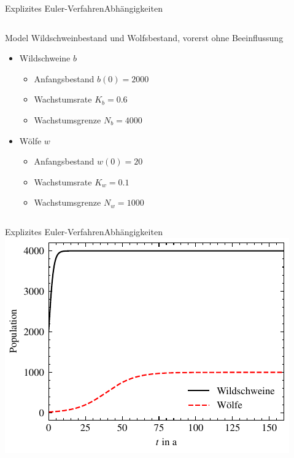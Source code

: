 \documentclass[xelatex,aspectratio=169]{beamer}
\begin{document}
\begin{frame}{Explizites Euler-Verfahren}{Abhängigkeiten}
    \begin{columns}
        \begin{column}{0.5\textwidth}
            \begin{block}{Model}
                Wildschweinbestand und Wolfsbestand, vorerst ohne Beeinflussung
                \begin{itemize}
                    \item Wildschweine $b$
                          \begin{itemize}
                              \item Anfangsbestand $b(0) = 2000$
                              \item Wachstumsrate $K_b = 0.6$
                              \item Wachstumsgrenze $N_b = 4000$
                          \end{itemize}
                    \item Wölfe $w$
                          \begin{itemize}
                              \item Anfangsbestand $w(0) = 20$
                              \item Wachstumsrate $K_w = 0.1$
                              \item Wachstumsgrenze $N_w = 1000$
                          \end{itemize}
                \end{itemize}
            \end{block}
        \end{column}
        \begin{column}{0.5\textwidth}
            \smaller
            \inputminted[firstline=7, lastline=21]{python}{src/sim_dependency_a.py}
        \end{column}
    \end{columns}
\end{frame}

\begin{frame}{Explizites Euler-Verfahren}{Abhängigkeiten}
    \centering
    \includegraphics[height=.8\textheight]{fig/sim_dependency_a.pdf}
\end{frame}
\end{document}

